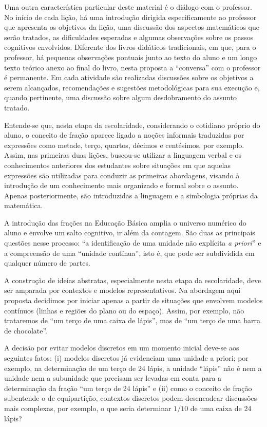 Uma outra característica particular deste material é o diálogo com o professor. No início de cada lição, há uma introdução dirigida especificamente ao professor que apresenta os objetivos da lição, uma discussão dos aspectos matemáticos que serão tratados, as dificuldades esperadas e algumas observações sobre os passos cognitivos envolvidos. Diferente dos livros didáticos tradicionais, em que, para o professor, há pequenas observações pontuais junto ao texto do aluno e um longo texto teórico anexo ao final do livro, nesta proposta a ``conversa'' com o professor é permanente. Em cada atividade são realizadas discussões sobre os objetivos a serem alcançados, recomendações e sugestões metodológicas para sua execução e, quando pertinente, uma discussão sobre algum desdobramento do assunto tratado.


Entende-se que, nesta etapa da escolaridade, considerando o cotidiano próprio do aluno, o conceito de fração aparece ligado a  noções informais traduzidas por expressões como metade, terço, quartos, décimos e centésimos, por exemplo. Assim, nas primeiras duas lições, buscou-se utilizar a linguagem verbal e os conhecimentos anteriores dos estudantes sobre situações em que aquelas expressões são utilizadas para conduzir as primeiras abordagens, visando à introdução de um conhecimento mais organizado e formal sobre o assunto. Apenas posteriormente, são introduzidas a linguagem e a simbologia próprias da matemática.

A introdução das frações na Educação Básica amplia o universo numérico do aluno e envolve um salto cognitivo, ir além da contagem. São duas as principais questões nesse processo: ``a identificação de uma unidade não explícita \textit{a priori}'' e a compreensão de uma  ``unidade contínua'', isto é, que pode ser subdividida em qualquer número de partes.

A construção de ideias abstratas, especialmente nesta etapa da escolaridade, deve ser amparada por contextos e modelos representativos. Na abordagem aqui proposta decidimos por iniciar apenas a partir de situações que envolvem modelos contínuos (linhas e regiões do plano ou do espaço). Assim, por exemplo, não trataremos de ``um terço de uma caixa de lápis'', mas de ``um terço de uma barra de chocolate''. 

A decisão por evitar modelos discretos em um momento inicial deve-se aos seguintes fatos: (i) modelos discretos já evidenciam uma unidade a priori; por exemplo, na determinação de um terço de 24 lápis, a unidade ``lápis'' não é nem a unidade nem a subunidade que precisam ser levadas em conta para a determinação da fração ``um terço de 24 lápis'' e (ii) como o conceito de fração subentende o de equipartição, contextos discretos podem desencadear discussões mais complexas, por exemplo, o que seria determinar $1/10$ de uma caixa de 24 lápis?

